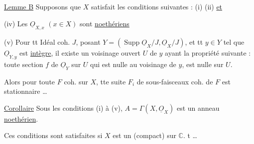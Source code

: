  \uline{Lemme B} Supposons  que $X$ satisfait les conditions suivantes : (i) (ii) \uline{et}

(iv) Les $\underline O_{X,x}$ $(x\in X)$ sont \uline{noethériens}

(v) Pour tt  Idéal coh. $J$,  posant $Y=(\operatorname{Supp}\underline O_X/J,\underline O_X/J)$, et tt $y\in Y$ tel que $\underline O_{Y,y}$ est \uline{intègre}, il existe un voisinage ouvert $U$ de $y$  ayant la propriété suivante : toute section $f$ de $\underline O_Y$ sur  $U$ qui est  nulle au voisinage de $y$, est nulle sur $U$.

Alors pour toute  $F$ coh. sur $X$,  tte suite  $F_i$ de sous-faisceaux coh. de $F$ est stationnaire \ldots

\uline{Corollaire} Sous les conditions (i) à (v), $A=\Gamma(X,\underline O_X)$ est un anneau \uline{noethérien}.

Ces conditions sont satisfaites si $X$ est un   (compact)  sur $\mathbb C$.  t  \ldots
